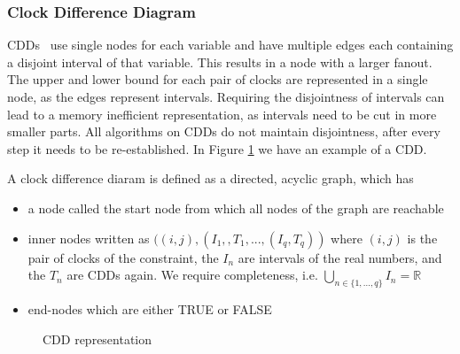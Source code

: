 \subsubsection{Clock Difference Diagram}
CDDs~\cite{BRICS19491} use single nodes for each variable and have multiple edges each containing a disjoint interval of that variable. This results in a node with a larger fanout. The upper and lower bound for each pair of clocks are represented in a single node, as the edges represent intervals. Requiring the disjointness of intervals can lead to a memory inefficient representation, as intervals need to be cut in more smaller parts. All algorithms on CDDs do not maintain disjointness, after every step it needs to be re-established. In Figure \ref{fig:cdd-example} we have an example of a CDD.

\begin{mydef}
A clock difference diaram is defined as a directed, acyclic graph, which has
\begin{itemize}
\item a node called the start node from which all nodes of the graph are reachable
\item inner nodes written as $((i,j),(I_1,,T_1,...,(I_q,T_q))$ where $(i,j)$ is the pair of clocks of the constraint, the $I_n$ are intervals of the real numbers, and the $T_n$ are CDDs again. We require completeness, i.e. $\bigcup_{n\in \{1,...,q\}}I_n= \mathbb{R}$
\item end-nodes which are either TRUE or FALSE
\end{itemize}

\end{mydef}

\begin{figure}[h]
\begin{center}
\end{center}
\caption{CDD representation}
\label{fig:cdd-example}
\end{figure}

